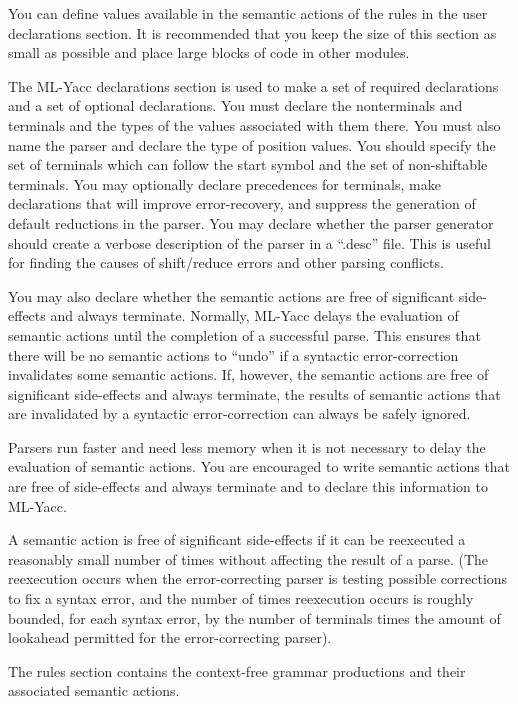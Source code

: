 You can define values available in the semantic
actions of the rules in the user declarations section.
It is recommended that you keep the size of this
section as small as possible and place large
blocks of code in other modules.

The ML-Yacc declarations section is used to make a set
of required declarations and a set of optional declarations.
You must declare the nonterminals and terminals and the
types of the values associated with them there.  You must
also name the parser and declare the type of position values.
You should specify the set of terminals which can follow
the start symbol and the set of non-shiftable terminals.
You may optionally declare precedences for terminals,
make declarations that will
improve error-recovery, and suppress the generation of
default reductions in the parser.  You may 
declare whether the parser generator should create
a verbose description of the parser in a ``.desc'' file.  This is useful
for finding the causes of shift/reduce errors and other parsing conflicts.

You may also declare whether the semantic actions are
free of significant side-effects and always terminate.  Normally, ML-Yacc
delays the evaluation of semantic actions until the completion of a
successful parse.  This ensures that there will be no semantic actions
to ``undo'' if a syntactic error-correction invalidates some semantic
actions.  If, however, the semantic actions are free of significant
side-effects and always terminate, the results of semantic actions that
are invalidated by a syntactic error-correction can always be safely
ignored.

Parsers run faster and need less memory when it is not
necessary to delay the evaluation of semantic actions.  You are
encouraged to write semantic actions that are free of side-effects and
always terminate and to declare this information to ML-Yacc.

A semantic action is free of significant side-effects if it can be reexecuted
a reasonably small number of times without affecting the result of a
parse.  (The reexecution occurs when the error-correcting parser is testing
possible corrections to fix a syntax error, and the number of times
reexecution occurs is roughly bounded, for each syntax error, by the number of
terminals times the amount of lookahead permitted for the error-correcting
parser).

The rules section contains the context-free grammar productions and their
associated semantic actions.

